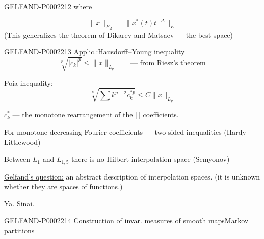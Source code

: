\begin{GelfandAdjacentEvidence}{GELFAND-P000221}{2}
where 
\end{GelfandAdjacentEvidence}

\begin{equation*}
 \|x\|_{E_\Delta}=\|x^*(t)t^{-\Delta}\|_E
\end{equation*}
(This generalizes the theorem of Dikarev and Matsaev — the best space)



\begin{GelfandAdjacentEvidence}{GELFAND-P000221}{3}
\underline{Applic.:}\quad Hausdorff–Young inequality
\begin{equation*}
 \sqrt[p]{|c_k|^p}\leq\|x\|_{L_p}\qquad\text{— from Riesz's theorem}
\end{equation*}
\end{GelfandAdjacentEvidence}

Poia inequality:
\begin{equation*}
 \sqrt[p]{\sum k^{p-2}c_k^{*p}}\leq C\|x\|_{L_p}
\end{equation*}



$c_k^*$ — the monotone rearrangement of the $|\ |$ coefficients.



For monotone decreasing Fourier coefficients — two-sided inequalities (Hardy–Littlewood)



Between $L_1$ and $L_{1,5}$ there is no Hilbert interpolation space (Semyonov)



\underline{Gelfand's question:} an abstract description of interpolation spaces.
(it is unknown whether they are spaces of functions.)



\underline{Ya. Sinai.}

\begin{GelfandAdjacentEvidence}{GELFAND-P000221}{4}
\underline{Construction of invar. measures of smooth maps}\quad\underline{Markov partitions}





\end{GelfandAdjacentEvidence}

